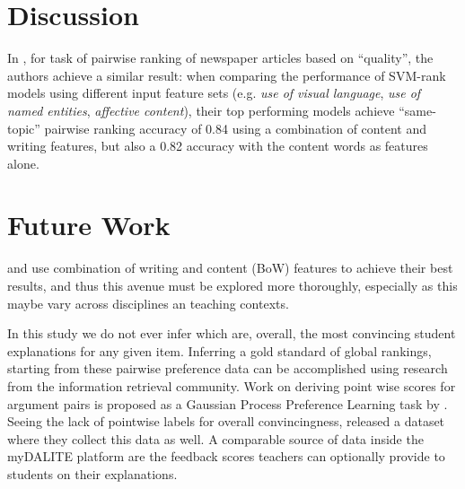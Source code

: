 \documentclass[runningheads]{llncs}
\begin{document}
\section{Discussion}

In \cite{louis_what_2013}, for task of pairwise ranking of newspaper articles 
based on ``quality'', the authors achieve a similar result: when comparing the 
performance of SVM-rank models using different input feature sets (e.g. 
\textit{use of visual language}, \textit{use of named entities}, 
\textit{affective content}), their top performing models achieve ``same-topic'' 
pairwise ranking accuracy of 0.84 using a combination of content and writing 
features, but also a 0.82 accuracy with the content words as features alone.


\section{Future Work}
\cite{nguyen_computational_2015} and \cite{louis_what_2013} use combination of 
writing and content (BoW) features to achieve their best results, and thus this 
avenue must be explored more thoroughly, especially as this maybe vary across 
disciplines an teaching contexts.

In this study we do not ever infer which are, overall, the most convincing 
student explanations for any given item. Inferring a gold standard of global 
rankings, starting from these pairwise preference data can be accomplished 
using research from the information retrieval 
community\cite{chen_pairwise_2013}. Work on deriving point wise scores for 
argument pairs is proposed as a Gaussian Process Preference Learning task by 
\cite{simpson_finding_2018}. Seeing the lack of pointwise labels for overall 
convincingness, \cite{toledo_automatic_2019} released a dataset where they 
collect this data as well. A comparable source of data inside the myDALITE 
platform are the feedback scores teachers can optionally provide to students on 
their explanations.


 
 
\end{document}
